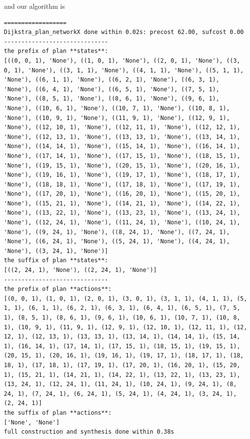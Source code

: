 and our algorithm is 
\begin{lstlisting}
==================
Dijkstra_plan_networkX done within 0.02s: precost 62.00, sufcost 0.00
------------------------------
the prefix of plan **states**:
[((0, 0, 1), 'None'), ((1, 0, 1), 'None'), ((2, 0, 1), 'None'), ((3, 0, 1), 'None'), ((3, 1, 1), 'None'), ((4, 1, 1), 'None'), ((5, 1, 1), 'None'), ((6, 1, 1), 'None'), ((6, 2, 1), 'None'), ((6, 3, 1), 'None'), ((6, 4, 1), 'None'), ((6, 5, 1), 'None'), ((7, 5, 1), 'None'), ((8, 5, 1), 'None'), ((8, 6, 1), 'None'), ((9, 6, 1), 'None'), ((10, 6, 1), 'None'), ((10, 7, 1), 'None'), ((10, 8, 1), 'None'), ((10, 9, 1), 'None'), ((11, 9, 1), 'None'), ((12, 9, 1), 'None'), ((12, 10, 1), 'None'), ((12, 11, 1), 'None'), ((12, 12, 1), 'None'), ((12, 13, 1), 'None'), ((13, 13, 1), 'None'), ((13, 14, 1), 'None'), ((14, 14, 1), 'None'), ((15, 14, 1), 'None'), ((16, 14, 1), 'None'), ((17, 14, 1), 'None'), ((17, 15, 1), 'None'), ((18, 15, 1), 'None'), ((19, 15, 1), 'None'), ((20, 15, 1), 'None'), ((20, 16, 1), 'None'), ((19, 16, 1), 'None'), ((19, 17, 1), 'None'), ((18, 17, 1), 'None'), ((18, 18, 1), 'None'), ((17, 18, 1), 'None'), ((17, 19, 1), 'None'), ((17, 20, 1), 'None'), ((16, 20, 1), 'None'), ((15, 20, 1), 'None'), ((15, 21, 1), 'None'), ((14, 21, 1), 'None'), ((14, 22, 1), 'None'), ((13, 22, 1), 'None'), ((13, 23, 1), 'None'), ((13, 24, 1), 'None'), ((12, 24, 1), 'None'), ((11, 24, 1), 'None'), ((10, 24, 1), 'None'), ((9, 24, 1), 'None'), ((8, 24, 1), 'None'), ((7, 24, 1), 'None'), ((6, 24, 1), 'None'), ((5, 24, 1), 'None'), ((4, 24, 1), 'None'), ((3, 24, 1), 'None')]
the suffix of plan **states**:
[((2, 24, 1), 'None'), ((2, 24, 1), 'None')]
------------------------------
the prefix of plan **actions**:
[(0, 0, 1), (1, 0, 1), (2, 0, 1), (3, 0, 1), (3, 1, 1), (4, 1, 1), (5, 1, 1), (6, 1, 1), (6, 2, 1), (6, 3, 1), (6, 4, 1), (6, 5, 1), (7, 5, 1), (8, 5, 1), (8, 6, 1), (9, 6, 1), (10, 6, 1), (10, 7, 1), (10, 8, 1), (10, 9, 1), (11, 9, 1), (12, 9, 1), (12, 10, 1), (12, 11, 1), (12, 12, 1), (12, 13, 1), (13, 13, 1), (13, 14, 1), (14, 14, 1), (15, 14, 1), (16, 14, 1), (17, 14, 1), (17, 15, 1), (18, 15, 1), (19, 15, 1), (20, 15, 1), (20, 16, 1), (19, 16, 1), (19, 17, 1), (18, 17, 1), (18, 18, 1), (17, 18, 1), (17, 19, 1), (17, 20, 1), (16, 20, 1), (15, 20, 1), (15, 21, 1), (14, 21, 1), (14, 22, 1), (13, 22, 1), (13, 23, 1), (13, 24, 1), (12, 24, 1), (11, 24, 1), (10, 24, 1), (9, 24, 1), (8, 24, 1), (7, 24, 1), (6, 24, 1), (5, 24, 1), (4, 24, 1), (3, 24, 1), (2, 24, 1)]
the suffix of plan **actions**:
['None', 'None']
full construction and synthesis done within 0.38s 
\end{lstlisting}

